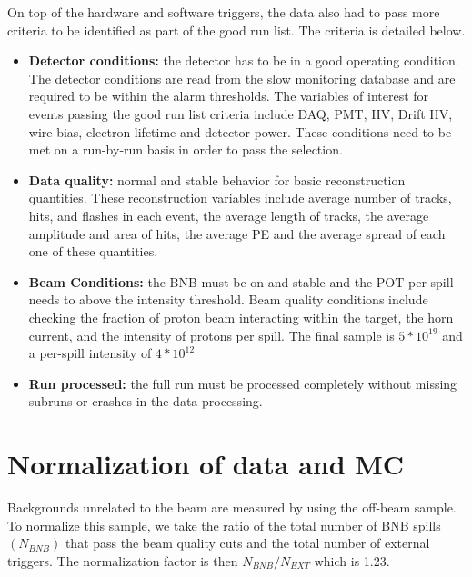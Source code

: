 On top of the hardware and software triggers, the data also had to pass more criteria to be identified as part of the good run list. The criteria is detailed below.
\begin{itemize}
\item{\textbf{Detector conditions:} the detector has to be in a good operating condition. The detector conditions are read from the slow monitoring database and are required to be within the alarm thresholds. The variables of interest for events passing the good run list criteria include DAQ, PMT, HV, Drift HV, wire bias, electron lifetime and detector power. These conditions need to be met on a run-by-run basis in order to pass the selection.}
\item{\textbf{Data quality:} normal and stable behavior for basic reconstruction quantities. These reconstruction variables include average number of tracks, hits, and flashes in each event, the average length of tracks, the average amplitude and area of hits, the average PE and the average spread of each one of these quantities.}
\item{\textbf{Beam Conditions:} the BNB must be on and stable and the POT per spill needs to above the intensity threshold. Beam quality conditions include checking the fraction of proton beam interacting within the target, the horn current, and the intensity of protons per spill. The final sample is $5 * 10^{19}$ and a per-spill intensity of $4 * 10^{12}$}
\item{\textbf{Run processed:} the full run must be processed completely without missing subruns or crashes in the data processing.}
\end{itemize}

\section{Normalization of data and MC}\label{section:normalize}
Backgrounds unrelated to the beam are measured by using the off-beam sample. To normalize this sample, we take the ratio of the total number of BNB spills \textit{$(N_{BNB})$} that pass the beam quality cuts and the total number of external triggers. The normalization factor is then \textit{$N_{BNB}/N_{EXT}$} which is 1.23. 

